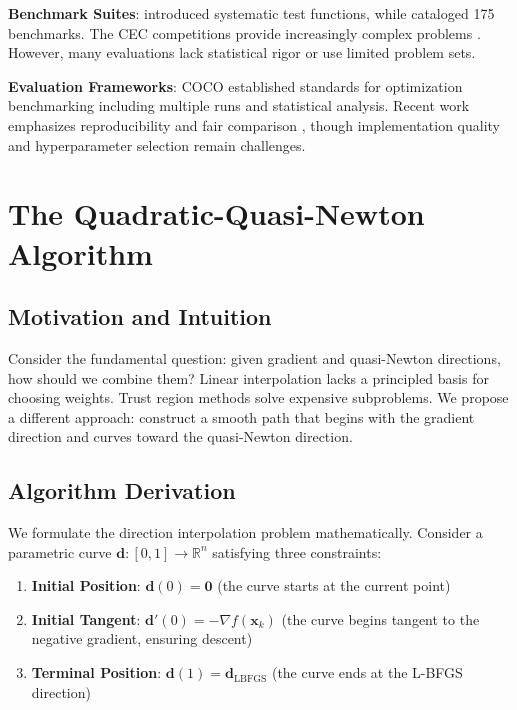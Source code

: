 \textbf{Benchmark Suites}: \citet{dejong1975analysis} introduced systematic test functions, while \citet{jamil2013literature} cataloged 175 benchmarks.
The CEC competitions provide increasingly complex problems \citep{liang2013problem}.
However, many evaluations lack statistical rigor or use limited problem sets.

\textbf{Evaluation Frameworks}: COCO \citep{hansen2016coco} established standards for optimization benchmarking including multiple runs and statistical analysis.
Recent work emphasizes reproducibility \citep{beiranvand2017best} and fair comparison \citep{schmidt2021descending}, though implementation quality and hyperparameter selection remain challenges.

\hypertarget{the-quadratic-quasi-newton-algorithm}{%
\section{The Quadratic-Quasi-Newton Algorithm}\label{the-quadratic-quasi-newton-algorithm}}

\hypertarget{motivation-and-intuition}{%
\subsection{Motivation and Intuition}\label{motivation-and-intuition}}

Consider the fundamental question: given gradient and quasi-Newton directions, how should we combine them?
Linear interpolation lacks a principled basis for choosing weights.
Trust region methods solve expensive subproblems.
We propose a different approach: construct a smooth path that begins with the gradient direction and curves toward the quasi-Newton direction.

\hypertarget{algorithm-derivation}{%
\subsection{Algorithm Derivation}\label{algorithm-derivation}}

We formulate the direction interpolation problem mathematically. Consider a parametric curve
\(\mathbf{d}: [0,1] \rightarrow \mathbb{R}^n\) satisfying three constraints:

\begin{enumerate}
\def\labelenumi{\arabic{enumi}.}
\item
  \textbf{Initial Position}: \(\mathbf{d}(0) = \mathbf{0}\) (the curve starts at the current point)
\item
  \textbf{Initial Tangent}: \(\mathbf{d}'(0) = -\nabla f(\mathbf{x}_k)\) (the curve begins tangent to the negative gradient, ensuring descent)
\item
  \textbf{Terminal Position}: \(\mathbf{d}(1) = \mathbf{d}_{\text{LBFGS}}\) (the curve ends at the L-BFGS direction)
\end{enumerate}

